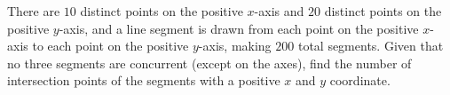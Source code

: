 There are $10$ distinct points on the positive $x$-axis and $20$ distinct points on the positive $y$-axis, and a line segment is drawn from each point on the positive $x$-axis to each point on the positive $y$-axis, making $200$ total segments. Given that no three segments are concurrent (except on the axes), find the number of intersection points of the segments with a positive $x$ and $y$ coordinate.
